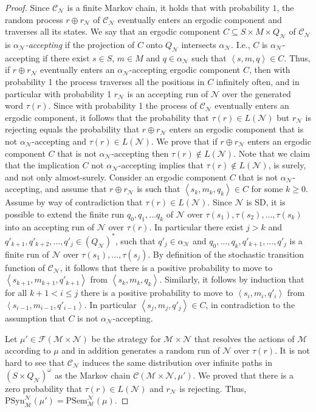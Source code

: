 \documentclass[10pt,a4paper]{amsart}
\theoremstyle{definition}
\numberwithin{equation}{section}
\newcommand{\C}{{\mathcal C}}
\newcommand{\M}{{\mathcal M}}
\newcommand{\F}{{\mathcal F}}
\newcommand{\zug}[1]{\left\langle #1 \right\rangle}
\newcommand{\N}{{\mathcal N}}
\begin{document}
\begin{proof}
	Since $\C_\N$ is a finite Markov chain, it holds that with probability $1$, the random process $r\oplus r_\N$ of $\C_\N$ eventually enters an ergodic component and traverses all its states. We say that an ergodic component $C\subseteq S\times M\times Q_\N$ of $\C_\N$ is \emph{$\alpha_\N$-accepting} if the projection of $C$ onto $Q_\N$ intersects $\alpha_\N$. I.e., $C$ is $\alpha_\N$-accepting if there exist $s\in S$, $m\in M$ and $q\in \alpha_\N$ such that $\zug{s, m, q}\in C$. Thus, if $r\oplus r_\N$ eventually enters an $\alpha_\N$-accepting ergodic component $C$, then with probability 1 the process traverses all the positions in $C$ infinitely often, and in particular with probability 1 $r_\N$ is an accepting run of $\N$ over the generated word $\tau(r)$. Since with probability 1 the process of $\C_\N$ eventually enters an ergodic component, it follows that the probability that $\tau(r)\in L(\N)$ but $r_\N$ is rejecting equals the probability that $r\oplus r_\N$ enters an ergodic component that is not $\alpha_\N$-accepting and $\tau(r)\in L(\N)$. We prove that if $r\oplus r_\N$ enters an ergodic component $C$ that is not $\alpha_\N$-accepting then $\tau(r)\notin L(\N)$. Note that we claim that the implication $C$ not $\alpha_\N$-accepting implies that $\tau(r)\notin L(\N)$, is surely, and not only almost-surely. 
	Consider an ergodic component $C$ that is not $\alpha_\N$-accepting, and assume that $r\oplus r_\N$ is such that $\zug{s_k,m_k,q_k}\in C$ for some $k\geq 0$. Assume by way of contradiction that $\tau(r)\in L(\N)$. Since $\N$ is SD, it is possible to extend the finite run $q_0,q_1,\ldots q_k$ of $\N$ over $\tau(s_1),\tau(s_2),\ldots,\tau(s_k)$ into an accepting run of $\N$ over $\tau(r)$. In particular there exist $j>k$ and $q'_{k+1},q'_{k+2},\ldots,q'_j\in (Q_\N)^*$, such that $q'_j\in \alpha_\N$ and $q_0,\ldots,q_k,q'_{k+1},\ldots,q'_j$ is a finite run of $\N$ over $\tau(s_1),\ldots,\tau(s_j)$. By definition of the stochastic transition function of $\C_\N$, it follows that there is a positive probability to move to $\zug{s_{k+1},m_{k+1},q'_{k+1}}$ from $\zug{s_k,m_k,q_k}$. Similarly, it follows by induction that for all $k+1< i\leq j$ there is a positive probability to move to $\zug{s_i,m_i,q'_i}$ from $\zug{s_{i-1},m_{i-1},q'_{i-1}}$. In particular $\zug{s_j,m_j,q'_j}\in C$, in contradiction to the assumption that $C$ is not $\alpha_\N$-accepting.
	
	Let $\mu'\in \F(\M\times \N)$ be the strategy for $\M\times \N$ that resolves the actions of $\M$ according to $\mu$ and in addition generates a random run of $\N$ over $\tau(r)$. It is not hard to see that $\C_\N$ induces the same distribution over infinite paths in $(S\times Q_\N)^\omega$ as the Markov chain $\C(\M\times\N,\mu')$. We proved that there is a zero probability that $\tau(r)\in L(\N)$ and $r_\N$ is rejecting. Thus, $\mathrm{PSyn}^\N_\M(\mu')=\mathrm{PSem}^\N_\M(\mu)$. 
\end{proof}
\end{document}
